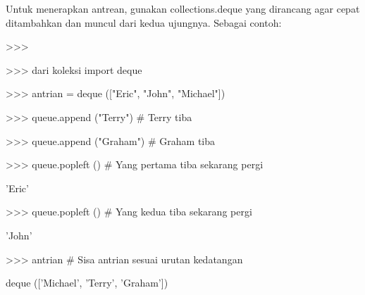 \documentclass[a4paper,12pt]{report}
\begin{document}
\vspace{12pt}
\noindent 
Untuk menerapkan antrean, gunakan collections.deque yang dirancang agar cepat ditambahkan dan muncul dari kedua ujungnya. Sebagai contoh: \par
\noindent 
>>> \par
\vspace{12pt}
\noindent 
>>> dari koleksi import deque \par
\noindent 
>>> antrian = deque (["Eric", "John", "Michael"]) \par
\noindent 
>>> queue.append ("Terry")  $  \#  $ Terry tiba \par
\noindent 
>>> queue.append ("Graham")  $  \#  $ Graham tiba \par
\noindent 
>>> queue.popleft ()  $  \#  $ Yang pertama tiba sekarang pergi \par
\noindent 
'Eric' \par
\noindent 
>>> queue.popleft ()  $  \#  $ Yang kedua tiba sekarang pergi \par
\noindent 
'John' \par
\noindent 
>>> antrian  $  \#  $ Sisa antrian sesuai urutan kedatangan \par
\noindent 
deque (['Michael', 'Terry', 'Graham']) \par
\vspace{14pt}
\end{document}
